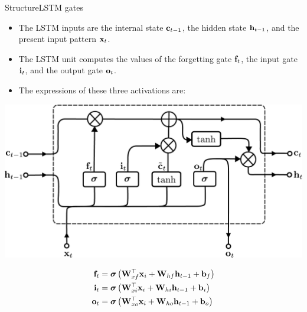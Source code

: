 \documentclass{beamer}
\begin{document}
\begin{frame}{Structure}{LSTM gates}
\begin{itemize}
\item The LSTM inputs are the internal state  ${\bf c}_{t-1}$, the hidden state ${\bf h}_{t-1}$, and the present input pattern ${\bf x}_t$. 
\item The LSTM unit computes the values of the forgetting gate ${\bf f}_t$, the input gate ${\bf i}_t$, and the output gate ${\bf o}_t$. 
\item The expressions of these three activations are:
   \end{itemize} 
\begin{multicols}{2}

\begin{center}
    \includegraphics[scale=0.25]{ Module 5 (RNN)/pics/Long_Short-Term_Memory.pdf}
\end{center}

\columnbreak 

\begin{equation}
    \begin{split}
        {\bf f}_t & = {\boldsymbol \sigma}\left({\bf W}_{xf}^\top {\bf x}_i +{\bf W}_{hf}{\bf h}_{t-1} + {\bf b}_f\right)\\
        {\bf i}_t & = {\boldsymbol \sigma}\left({\bf W}_{xi}^\top {\bf x}_i +{\bf W}_{hi}{\bf h}_{t-1} + {\bf b}_i\right)\\
        {\bf o}_t & = {\boldsymbol \sigma}\left({\bf W}_{xo}^\top {\bf x}_i +{\bf W}_{ho}{\bf h}_{t-1} + {\bf b}_o\right)\\
    \end{split}
\end{equation}

\end{multicols}
 
\end{frame}
\end{document}
